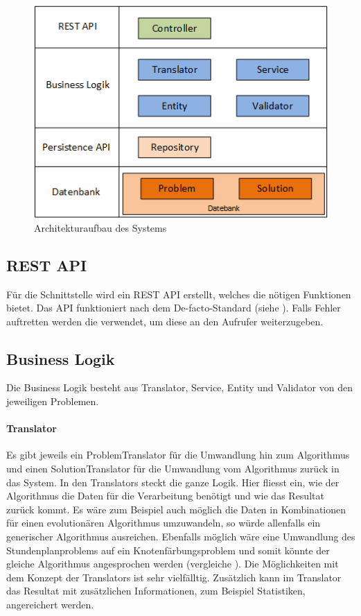 \begin{figure}[h]
\centering
\includegraphics[scale=0.8]{images/visio/architektur_db.png}
\caption[Architekturaufbau des Systems]{Architekturaufbau des Systems \selfmade{}}
\label{fig:architektur}
\end{figure}
 
\FloatBarrier
\subsection{REST API}
Für die Schnittstelle wird ein REST API erstellt, welches die nötigen Funktionen bietet. Das API funktioniert nach dem De-facto-Standard (siehe \cite{wiki_restful}). 
Falls Fehler auftretten werden die  verwendet, um diese an den Aufrufer weiterzugeben.

\subsection{Business Logik}
Die Business Logik besteht aus Translator, Service, Entity und Validator von den jeweiligen Problemen. 
\paragraph{Translator}
Es gibt jeweils ein ProblemTranslator für die Umwandlung hin zum Algorithmus und einen SolutionTranslator für die Umwandlung vom Algorithmus zurück in das System. In den Translators steckt 
die ganze Logik. Hier fliesst ein, wie der Algorithmus die Daten für die Verarbeitung benötigt und wie das Resultat zurück kommt. Es wäre zum Beispiel auch möglich die Daten in Kombinationen 
für einen evolutionären Algorithmus umzuwandeln, so würde allenfalls ein generischer Algorithmus ausreichen. Ebenfalls möglich wäre eine Umwandlung des Stundenplanproblems auf 
ein Knotenfärbungsproblem und somit könnte der gleiche Algorithmus angesprochen werden (vergleiche \cite{timetabling_abdullah}). Die Möglichkeiten mit dem Konzept der Translators ist sehr vielfälltig. Zusätzlich kann im 
Translator das Resultat mit zusätzlichen Informationen, zum Beispiel Statistiken, angereichert werden.
